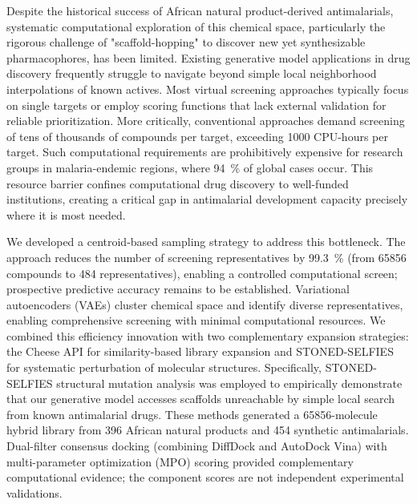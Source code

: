 \documentclass[journal=jcisd8,manuscript=article]{achemso}
\begin{document}
Despite the historical success of African natural product-derived antimalarials, systematic computational exploration of this chemical space, particularly the rigorous challenge of "scaffold-hopping" to discover new yet synthesizable pharmacophores, has been limited. Existing generative model applications in drug discovery frequently struggle to navigate beyond simple local neighborhood interpolations of known actives. Most virtual screening approaches typically focus on single targets or employ scoring functions that lack external validation for reliable prioritization. More critically, conventional approaches demand screening of tens of thousands of compounds per target, exceeding \num{1000} CPU-hours per target. Such computational requirements are prohibitively expensive for research groups in malaria-endemic regions, where \qty{94}{\percent} of global cases occur. This resource barrier confines computational drug discovery to well-funded institutions, creating a critical gap in antimalarial development capacity precisely where it is most needed.

We developed a centroid-based sampling strategy to address this bottleneck. The approach reduces the number of screening representatives by \qty{99.3}{\percent} (from \num{65856} compounds to \num{484} representatives), enabling a controlled computational screen; prospective predictive accuracy remains to be established. Variational autoencoders (VAEs) cluster chemical space and identify diverse representatives, enabling comprehensive screening with minimal computational resources. We combined this efficiency innovation with two complementary expansion strategies: the Cheese API \cite{lzicar_cheese_2024} for similarity-based library expansion and STONED-SELFIES \cite{Krenn2020} for systematic perturbation of molecular structures. Specifically, STONED-SELFIES structural mutation analysis was employed to empirically demonstrate that our generative model accesses scaffolds unreachable by simple local search from known antimalarial drugs. These methods generated a \num{65856}-molecule hybrid library from \num{396} African natural products and \num{454} synthetic antimalarials. Dual-filter consensus docking (combining DiffDock and AutoDock Vina) with multi-parameter optimization (MPO) scoring provided complementary computational evidence; the component scores are not independent experimental validations.
\end{document}
